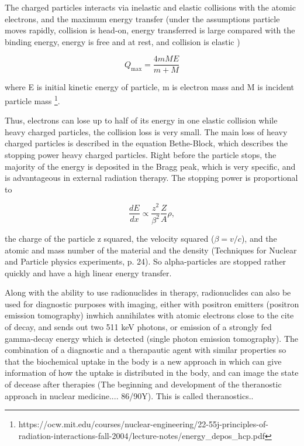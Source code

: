 The charged particles interacts via inelastic and elastic collisions with the atomic electrons, and the maximum energy transfer (under the assumptions particle moves rapidly, collision is head-on, energy transferred is large compared with the binding energy, energy is free and at rest, and collision is elastic )

\begin{equation}
    Q_\text{max}=\frac{4mME}{m+M}
\end{equation}

where E is initial kinetic energy of particle, m is electron mass and M is incident particle mass \footnote{https://ocw.mit.edu/courses/nuclear-engineering/22-55j-principles-of-radiation-interactions-fall-2004/lecture-notes/energy_depos_hcp.pdf}.  

Thus, electrons can lose up to half of its energy in one elastic collision while heavy charged particles, the collision loss is very small. The main loss of heavy charged particles is described in the equation Bethe-Block, which describes the stopping power heavy charged particles. Right before the particle stops, the majority of the energy is deposited in the Bragg peak, which is very specific, and is advantageous in external radiation therapy. The stopping power is proportional to 

\begin{equation}
    \frac{dE}{dx}\propto \frac{z^2}{\beta^2}\frac{Z}{A} \rho,
\end{equation}

the charge of the particle z squared, the velocity squared ($\beta=v/c$), and the atomic and mass number of the material and the density (Techniques for Nuclear and Particle physics experiments, p.  24). So alpha-particles are stopped rather quickly and have a high linear energy transfer. 






\noindent
Along with the ability to use radionuclides in therapy, radionuclides can also be used for diagnostic purposes with imaging, either with positron emitters (positron emission tomography) inwhich annihilates with atomic electrons close to the cite of decay, and sends out two 511 keV photons, or emission of a strongly fed gamma-decay energy which is detected (single photon emission tomography). The combination of a diagnostic and a therapautic agent with similar properties so that the biochemical uptake in the body is a new approach in which can give information of how the uptake is distributed in the body, and can image the state of decease after therapies (The beginning and development of the theranostic approach in nuclear medicine.... 86/90Y). This is called theranostics.. 

